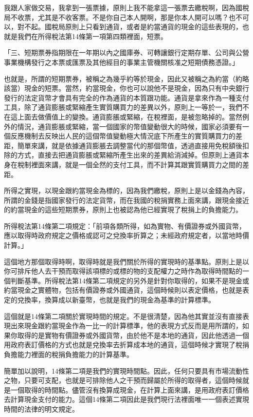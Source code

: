 \documentclass[]{ctexbook}
\begin{document}
我跟人家做交易，我拿到一張票據，原則上我不能拿這一張票去繳稅啊，因為國稅局不收票，尤其是不收客票。不是你自己本人開啊，那是你本人開可以嗎？也不可以，對不起。國稅局原則上只看到通貨，或者是約當通貨的現金的這些表現的，也就是我們在所得稅法第14條第一項第四類裡面，短票。

「三、短期票券指期限在一年期以內之國庫券、可轉讓銀行定期存單、公司與公營事業機構發行之本票或匯票及其他經目的事業主管機關核准之短期債務憑證。」

也就是，所謂的短期票券，被稱之為幾乎約等於現金，因此又被稱之為約當（約略該當）現金的短票。當然，約當現金，你也可以說他不是現金，因為只有中央銀行發行的法定貨幣才會具有完全的作為通貨的本質跟功能。通貨是拿來作為一種支付工具，除了通貨膨脹或緊縮產生實質購買力的差異以外，原則上一等於一，我們不在這上面去做價值上的變換。通貨膨脹或緊縮，在稅裡面，是被忽略掉的。當然例外的情況，通貨膨脹或緊縮，當一個國家的幣值變動很大的時候，國家必須要有一個反應機制去反映出人民的這個幣值變動極大情況底下所產生的實質購買力的差距，簡單來講，就是依據通貨膨脹去調整當代的那個幣值，透過直接用免稅額後扣除的方式，直接去把通貨膨脹或緊縮所產生出來的差異給消減掉。但原則上通貨本身在稅制裡面來講，就是一個全然的支付工具，而不計算其跟實質購買力之間的差距。

所得之實現，以現金跟約當現金為標的，因為我們繳稅，原則上是以金錢為內容，所謂的金錢是指國家發行的法定貨幣，而在我國的稅捐實務上面來講，跟現金接近的約當現金的這些短期票券，原則上也被認為他已經實現了稅捐上的負擔能力。

所得稅法第14條第二項規定：「前項各類所得，如為實物、有價證券或外國貨幣，應以取得時政府規定之價格或認可之兌換率折算之；未經政府規定者，以當地時價計算。」

這個地方那個取得時啊，取得時就是我們關於所得的實現時的基準點。原則上是以你可排斥他人去干預而取得該項標的或標的物的支配權力之時作為取得時間點的一個判斷基準。所得稅法第14條第二項規定的另外是針對你取得的，如果不是現金或約當現金之實體物，包括有價證券或外國通貨，這個時候則以表定價格，也就是表定的兌換率，換算成以新臺幣，也就是我們的現金為基準的計算標準。

這個就是14條第二項關於實現時間的規定。不是很清楚，因為他其實並沒有直接表現出來現金跟約當現金作為一比一的計算標準，他的表現方式反而是用所謂的，如果你取得的是實物有價證券或外國貨幣，由於他不是本地的通貨，因此他透過一個用政府表訂價格的方式也就是兌換率去折算成本地的通貨，這個時候才實現了稅捐負擔能力裡面的稅捐負擔能力的計算基準。

簡單加以說明，14條第二項是我們的實現時間點。因此，任何只要具有市場流動性之物，只要可支配，也就是可排除他人之干預而歸屬於所得的取得者，這個時候就是一個取得的時間點。儘管沒有換算成現金，在計算上面來講，是用政府表訂價格去計算現金支付的能力。這個14條第二項因此是我們現行法裡面唯一一個表述實現時間的法律的明文規定。
\end{document}
